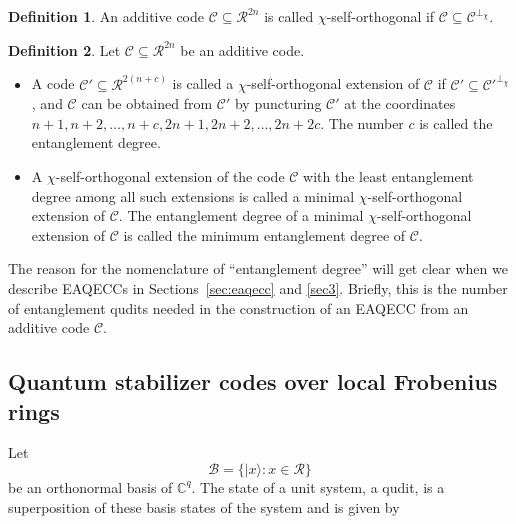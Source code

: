 \documentclass{article}
\theoremstyle{remark}
\theoremstyle{definition}
\newtheorem{defin}{Definition}[section]
\numberwithin{equation}{section}
\begin{document}
\begin{defin}
\label{def:chi-self-ortho}
An additive code $\mathcal{C} \subseteq \mathcal{R}^{2n}$ is called $\chi$-self-orthogonal if $\mathcal{C} \subseteq \mathcal{C}^{\perp_\chi}$.
\end{defin}

\begin{defin} \label{def:chi-ext}
 Let $\mathcal{C} \subseteq \mathcal{R}^{2n}$ be an additive code.
\begin{itemize}
\item A code $\mathcal{C}' \subseteq \mathcal{R}^{2(n+c)}$ is called a $\chi$-self-orthogonal extension of $\mathcal{C}$ if $\mathcal{C}' \subseteq \mathcal{C}'^{\perp_\chi}$, and $\mathcal{C}$ can be obtained from $\mathcal{C}{'} $ by puncturing $\mathcal{C}{'} $ at the coordinates $n+1,n+2,\ldots,n+c, 2n+1,2n+2,\ldots,2n+2c$. The number $c$ is called the entanglement degree. 
\item A $\chi$-self-orthogonal extension of the code $\mathcal{C}$ with the least entanglement degree among all such extensions is called a minimal $\chi$-self-orthogonal extension of $\mathcal{C}.$ The entanglement degree of a minimal $\chi$-self-orthogonal extension of $\mathcal{C}$ is called the minimum entanglement degree of $\mathcal{C}.$
\end{itemize}
\end{defin}

The reason for the nomenclature of ``entanglement degree'' will get clear when we describe EAQECCs in Sections~\ref{sec:eaqecc} and \ref{sec3}. Briefly, this is the number of entanglement qudits needed in the construction of an EAQECC from an additive code $\mathcal{C}$.


  
  

   
\subsection{Quantum stabilizer codes over local Frobenius rings}\label{sec:stabcodes}

  
Let $$\mathcal{B}=\{| x\rangle : x \in \mathcal{R}\}$$  be an orthonormal basis of ${\mathbb{C}}^{q}.$ The state of a unit system, a qudit, is a superposition of these basis states of the system and is given by
\end{document}
